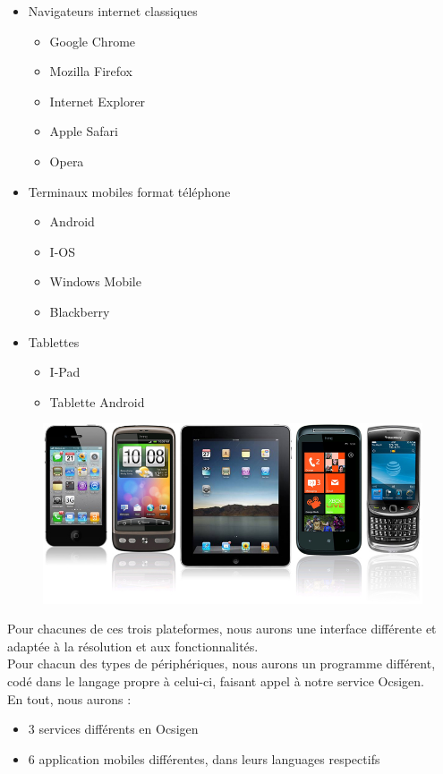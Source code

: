 \documentclass{life-fr}
\begin{document}
\begin{itemize}
  \item Navigateurs internet classiques
    \begin{itemize}
      \item Google Chrome
      \item Mozilla Firefox
      \item Internet Explorer
      \item Apple Safari
      \item Opera
    \end{itemize}
  \item Terminaux mobiles format téléphone
    \begin{itemize}
      \item Android
      \item I-OS
      \item Windows Mobile
      \item Blackberry
    \end{itemize}
  \item Tablettes
    \begin{itemize}
      \item I-Pad
      \item Tablette Android
    \end{itemize}
\end{itemize}

\begin{figure}[H]
  \begin{center}
    \includegraphics[width=13cm]{img/mobiles.jpg}
  \end{center}
\end{figure}

Pour chacunes de ces trois plateformes, nous aurons une interface différente
et adaptée à la résolution et aux fonctionnalités.\\
Pour chacun des types de périphériques, nous aurons un programme différent,
codé dans le langage propre à celui-ci, faisant appel à notre service Ocsigen.\\
En tout, nous aurons :
\begin{itemize}
  \item 3 services différents en Ocsigen
  \item 6 application mobiles différentes, dans leurs languages respectifs
\end{itemize}
\end{document}
